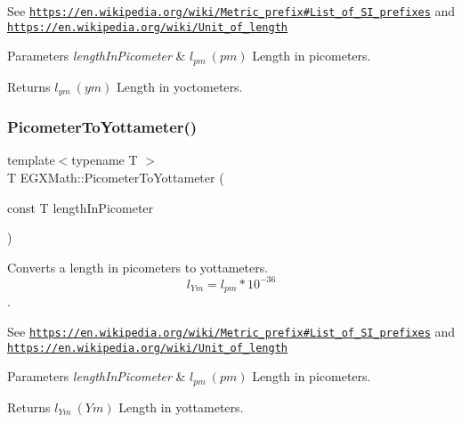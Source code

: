 See \href{https://en.wikipedia.org/wiki/Metric_prefix#List_of_SI_prefixes}{\tt https\+://en.\+wikipedia.\+org/wiki/\+Metric\+\_\+prefix\#\+List\+\_\+of\+\_\+\+S\+I\+\_\+prefixes} and \href{https://en.wikipedia.org/wiki/Unit_of_length}{\tt https\+://en.\+wikipedia.\+org/wiki/\+Unit\+\_\+of\+\_\+length} 
\begin{DoxyParams}{Parameters}
{\em length\+In\+Picometer} & $ l_{pm}\ (pm)$ Length in picometers. \\
\hline
\end{DoxyParams}
\begin{DoxyReturn}{Returns}
$ l_{ym}\ (ym)$ Length in yoctometers. 
\end{DoxyReturn}
\mbox{\label{group___e_g_x_math-_conversions-_length_conversions-_s_i-_picometer-_s_i_ga02d71cee34c4570a0c17529eb481a26f}} 
\subsubsection{\texorpdfstring{Picometer\+To\+Yottameter()}{PicometerToYottameter()}}
{\footnotesize\ttfamily template$<$typename T $>$ \\
T E\+G\+X\+Math\+::\+Picometer\+To\+Yottameter (\begin{DoxyParamCaption}\item[{const T}]{length\+In\+Picometer }\end{DoxyParamCaption})}



Converts a length in picometers to yottameters. \[ l_{Ym}=l_{pm} * 10^{-36} \]. 

See \href{https://en.wikipedia.org/wiki/Metric_prefix#List_of_SI_prefixes}{\tt https\+://en.\+wikipedia.\+org/wiki/\+Metric\+\_\+prefix\#\+List\+\_\+of\+\_\+\+S\+I\+\_\+prefixes} and \href{https://en.wikipedia.org/wiki/Unit_of_length}{\tt https\+://en.\+wikipedia.\+org/wiki/\+Unit\+\_\+of\+\_\+length} 
\begin{DoxyParams}{Parameters}
{\em length\+In\+Picometer} & $ l_{pm}\ (pm)$ Length in picometers. \\
\hline
\end{DoxyParams}
\begin{DoxyReturn}{Returns}
$ l_{Ym}\ (Ym)$ Length in yottameters. 
\end{DoxyReturn}
\mbox{\label{group___e_g_x_math-_conversions-_length_conversions-_s_i-_picometer-_s_i_ga6aa4200739cdc21650592e995e8945cd}} 
